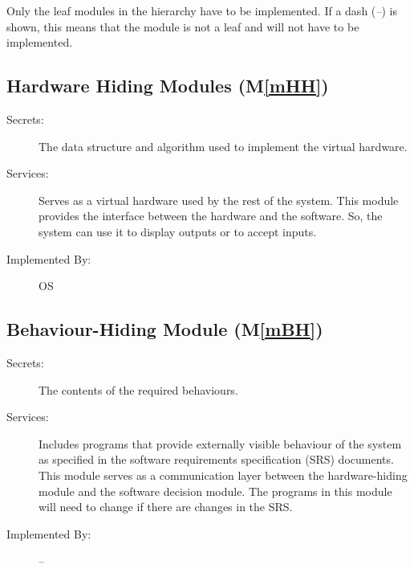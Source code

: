 \documentclass[12pt, titlepage]{article}
\newcommand{\mref}[1]{M\ref{#1}}
\begin{document}
Only the leaf modules in the hierarchy have to be implemented. If a dash
(\emph{--}) is shown, this means that the module is not a leaf and will not have
to be implemented.

\subsection{Hardware Hiding Modules (\mref{mHH})}

\begin{description}
\item[Secrets:]The data structure and algorithm used to implement the virtual
  hardware.
\item[Services:]Serves as a virtual hardware used by the rest of the
  system. This module provides the interface between the hardware and the
  software. So, the system can use it to display outputs or to accept inputs.
\item[Implemented By:] OS
\end{description}

\subsection{Behaviour-Hiding Module (\mref{mBH})}

\begin{description}
\item[Secrets:]The contents of the required behaviours.
\item[Services:]Includes programs that provide externally visible behaviour of
  the system as specified in the software requirements specification (SRS)
  documents. This module serves as a communication layer between the
  hardware-hiding module and the software decision module. The programs in this
  module will need to change if there are changes in the SRS.
\item[Implemented By:] --
\end{description}

%
\end{document}
